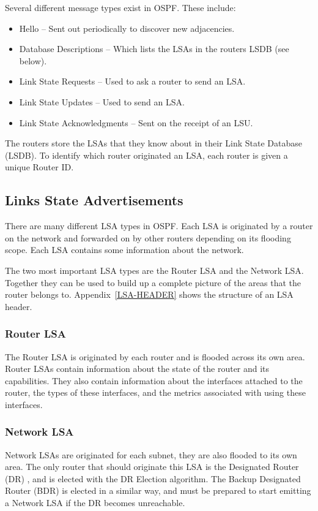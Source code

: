 \documentclass[12pt]{report}
\begin{document}
Several different message types exist in OSPF\@. These include:
\begin{itemize}
 \item Hello -- Sent out periodically to discover new adjacencies.
 \item Database Descriptions -- Which lists the LSAs in the routers LSDB (see below).
 \item Link State Requests -- Used to ask a router to send an LSA.
 \item Link State Updates -- Used to send an LSA.
 \item Link State Acknowledgments -- Sent on the receipt of an LSU.
\end{itemize}

The routers store the LSAs that they know about in their Link State Database
(LSDB). To identify which router
originated an LSA, each router is given a unique Router ID.

\subsection{Links State Advertisements}
There are many different LSA types in OSPF\@. Each LSA is originated by
a router on the network and forwarded on by other routers depending on its
flooding scope. Each LSA contains some information about the network. 
 
The two most important LSA types are the Router LSA and the Network LSA\@.
Together they can be used to build up a complete picture of the areas that the
router belongs to. Appendix~\ref{LSA-HEADER} shows the structure of
an LSA header. 

\subsubsection{Router LSA}
The Router LSA is originated by each router and is flooded across its own area.
Router LSAs contain information about the state of the router and its
capabilities. They also contain information about the interfaces attached to
the router, the types of these interfaces, and the metrics associated with
using these interfaces. 

\subsubsection{Network LSA}
Network LSAs are originated for each subnet, they are also flooded to its own
area.  The only router that should originate this LSA is the Designated Router
(DR) , and is elected with the DR Election
algorithm. The Backup Designated Router (BDR)  is elected in a similar way, and must be prepared to start
emitting a Network LSA if the DR becomes unreachable. 
\end{document}
